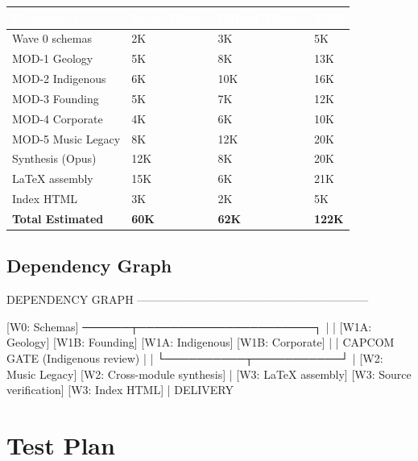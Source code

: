 \documentclass[11pt,letterpaper]{article}
\newcommand{\tableheader}[1]{\textbf{\sffamily\textcolor{white}{#1}}}
\begin{document}
\begin{center}
\begin{tabularx}{\textwidth}{L{3.5cm}C{2.5cm}C{2.5cm}C{2.5cm}}
\toprule
{}
\tableheader{Component} & \tableheader{Input Tokens} & \tableheader{Output Tokens} & \tableheader{Total} \\
\midrule
Wave 0 schemas & 2K & 3K & 5K \\
MOD-1 Geology & 5K & 8K & 13K \\
MOD-2 Indigenous & 6K & 10K & 16K \\
MOD-3 Founding & 5K & 7K & 12K \\
MOD-4 Corporate & 4K & 6K & 10K \\
MOD-5 Music Legacy & 8K & 12K & 20K \\
Synthesis (Opus) & 12K & 8K & 20K \\
LaTeX assembly & 15K & 6K & 21K \\
Index HTML & 3K & 2K & 5K \\
\midrule
{}
\textbf{Total Estimated} & \textbf{60K} & \textbf{62K} & \textbf{122K} \\
\bottomrule
\end{tabularx}
\end{center}

\subsection{Dependency Graph}

\begin{asciibox}
DEPENDENCY GRAPH
--------------------------------------------------------------

[W0: Schemas] ──────┬──────────────────────┐
                    |                      |
             [W1A: Geology]        [W1B: Founding]
             [W1A: Indigenous]     [W1B: Corporate]
                    |                      |
              CAPCOM GATE (Indigenous review)
                    |                      |
                    └──────────┬───────────┘
                               |
                    [W2: Music Legacy]
                    [W2: Cross-module synthesis]
                               |
                    [W3: LaTeX assembly]
                    [W3: Source verification]
                    [W3: Index HTML]
                               |
                          DELIVERY
\end{asciibox}

\section{Test Plan}
\end{document}
